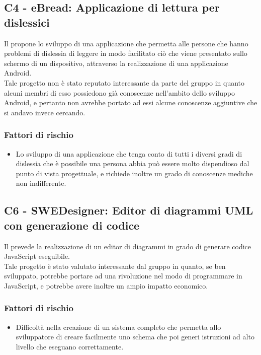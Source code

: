 \subsection{C4 - eBread: Applicazione di lettura per dislessici}
Il  propone lo sviluppo di una applicazione che permetta alle persone che hanno problemi di dislessia di leggere in modo facilitato ciò che viene presentato sullo schermo di un dispositivo, attraverso la realizzazione di una applicazione Android. \\
Tale progetto non è stato reputato interessante da parte del gruppo in quanto alcuni membri di esso possiedono già conoscenze nell'ambito dello sviluppo Android, e pertanto non avrebbe portato ad essi alcune conoscenze aggiuntive che si andavo invece cercando.

\subsubsection{Fattori di rischio}
\begin{itemize}
	\item Lo sviluppo di una applicazione che tenga conto di tutti i diversi gradi di dislessia che è possibile una persona abbia può essere molto dispendioso dal punto di vista progettuale, e richiede inoltre un grado di conoscenze mediche non indifferente.
\end{itemize}

\subsection{C6 - SWEDesigner: Editor di diagrammi UML con generazione di codice}
Il  prevede la realizzazione di un editor di diagrammi  in grado di generare codice JavaScript eseguibile. \\
Tale progetto è stato valutato interessante dal gruppo in quanto, se ben sviluppato, potrebbe portare ad una rivoluzione nel modo di programmare in JavaScript, e potrebbe avere inoltre un ampio impatto economico.

\subsubsection{Fattori di rischio}
\begin{itemize}
	\item Difficoltà nella creazione di un sistema completo che permetta allo sviluppatore di creare facilmente uno schema che poi generi istruzioni ad alto livello che eseguano correttamente.
\end{itemize}

\newpage
